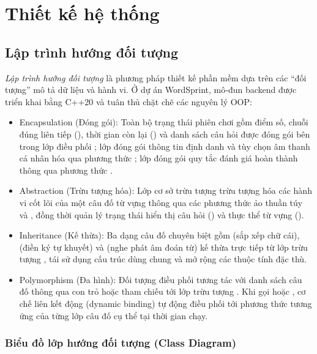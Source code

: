 \chapter{Thiết kế hệ thống}
\label{chap:system_design}

\section{Lập trình hướng đối tượng}
\label{sec:oop}
\textit{Lập trình hướng đối tượng} là phương pháp thiết kế phần mềm dựa trên các ``đối tượng'' mô tả dữ liệu và hành vi. Ở dự án WordSprint, mô‑đun backend được triển khai bằng C++20 và tuân thủ chặt chẽ các nguyên lý OOP:
\begin{itemize}
    \item Encapsulation (Đóng gói): Toàn bộ trạng thái phiên chơi gồm điểm số, chuỗi đúng liên tiếp (), thời gian còn lại () và danh sách câu hỏi được đóng gói bên trong lớp điều phối ; lớp  đóng gói thông tin định danh và tùy chọn âm thanh cá nhân hóa qua phương thức ; lớp  đóng gói quy tắc đánh giá hoàn thành thông qua phương thức .
    \item Abstraction (Trừu tượng hóa): Lớp cơ sở trừu tượng  trừu tượng hóa các hành vi cốt lõi của một câu đố từ vựng thông qua các phương thức ảo thuần túy  và , đồng thời quản lý trạng thái hiển thị câu hỏi () và thực thể từ vựng ().
    \item Inheritance (Kế thừa): Ba dạng câu đố chuyên biệt gồm  (sắp xếp chữ cái),  (điền ký tự khuyết) và  (nghe phát âm đoán từ) kế thừa trực tiếp từ lớp trừu tượng , tái sử dụng cấu trúc dùng chung và mở rộng các thuộc tính đặc thù.
    \item Polymorphism (Đa hình): Đối tượng điều phối  tương tác với danh sách câu đố thông qua con trỏ hoặc tham chiếu tới lớp trừu tượng . Khi gọi  hoặc , cơ chế liên kết động (dynamic binding) tự động điều phối tới phương thức tương ứng của từng lớp câu đố cụ thể tại thời gian chạy.
\end{itemize}

\subsection{Biểu đồ lớp hướng đối tượng (Class Diagram)}
\label{subsec:class_diagram}

